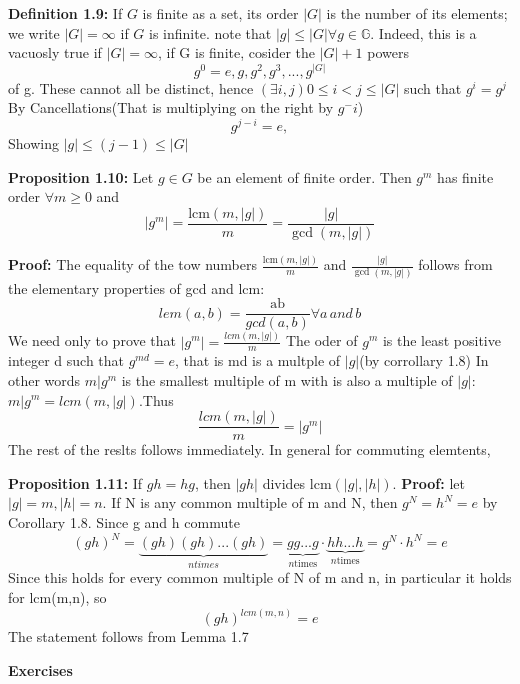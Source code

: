 \textbf{Definition 1.9:} If $G$ is finite as a set, its order $|G|$ is the number of its elements; we write $|G| = \infty$ if $G$ is infinite. %
note that $|g| \le |G| \forall g \in \mathbb{G}$. Indeed, this is a vacuosly true if $|G| = \infty$, if G is finite, cosider the $|G| + 1$ powers
$$g^0 = e, g,g^2,g^3, ..., g^{|G|}$$ of g. These cannot all be distinct, hence $(\exists i,j) 0 \le i < j \le |G|$ such that $g^i = g^j$
By Cancellations(That is multiplying on  the right by $g^-i$)
$$g^{j-i} = e,$$
Showing $|g| \le (j-1) \le |G|$

\textbf{Proposition 1.10:} Let $g \in G$ be an element of finite order. Then $g^m$ has finite order $\forall m \ge 0$ and %
$$|g^m| = \frac{\text{lcm}(m, |g|)}{m} = \frac{|g|}{\gcd(m, |g|)}$$ %

\textbf{Proof:} The equality of the tow numbers $\frac{\text{lcm}(m, |g|)}{m}$ and $\frac{|g|}{\gcd(m, |g|)}$ follows from the elementary properties of gcd and lcm:
$$lem(a,b) =  \frac{\text{ab}}{gcd(a,b)} \forall a \, and \, b$$
We need only to prove that $|g^m| = \frac{lcm(m,|g|)}{m}$
The oder of $g^m$ is the least positive integer d such that $g^{md} = e$, that is md is a multple of $|g|$(by corrollary 1.8)
In other words $m | g^m$ is the smallest multiple of m with is also a multiple of $|g|$: $m | g^m = lcm(m,|g|)$.Thus
$$\frac{lcm(m,|g|)}{m} = |g^m|$$ The rest of the reslts follows immediately. In general for commuting elemtents,

\textbf{Proposition 1.11:} If $gh = hg$, then $|gh|$ divides $\text{lcm}(|g|, |h|)$. %
\textbf{Proof:} let $|g| = m, |h| =n$. If N is any common multiple of m and N, then $g^N = h^N = e$ by Corollary 1.8. Since g and h commute
$$(gh)^N = \underbrace{(gh)(gh)...(gh)}_{n times} = \underbrace{gg...g}_{n \text{times}} \cdot\underbrace{hh...h}_{n \text{times}} = g^N \cdot h^N = e$$
Since this holds for every common multiple of N of m and n, in particular it holds for lcm(m,n), so
$$(gh)^{lcm(m,n)} = e$$
The statement follows from Lemma 1.7

\textbf{Exercises}

